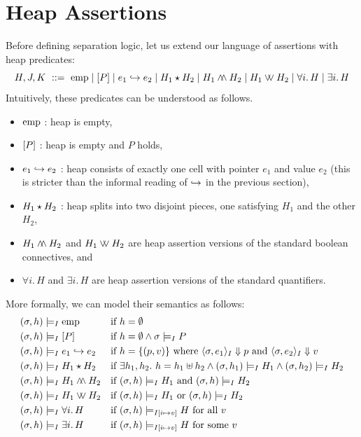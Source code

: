 \section{Heap Assertions}
%
Before defining separation logic, let us extend our language of assertions with heap predicates:
\[
  H,J,K\ ::=\ \emp\mid\pure{P}\mid e_1\pto e_2\mid H_1\sep H_2\mid H_1\hand H_2\mid H_1\hor H_2
  \mid\forall i.\,H\mid\exists i.\,H
\]
Intuitively, these predicates can be understood as follows.
\begin{itemize}
  \item $\mathrm{emp}$ : heap is empty,
  \item $[P]$ : heap is empty and $P$ holds,
  \item $e_1\hookrightarrow e_2$ : heap consists of exactly one cell with pointer $e_1$ and value $e_2$ (this
    is stricter than the informal reading of $\hookrightarrow$ in the previous section),
  \item $H_1\mathbin{\star} H_2$ : heap splits into two disjoint pieces, one satisfying $H_1$ and the other
    $H_2$,
  \item $H_1\mathbin{\wedge\!\!\wedge} H_2$ and $H_1\mathbin{\vee\!\!\vee} H_2$ are heap assertion versions of the standard boolean
    connectives, and
  \item $\forall i.\,H$ and $\exists i.\,H$ are heap assertion versions of the standard
    quantifiers.
\end{itemize}
More formally, we can model their semantics as follows:
\begin{align*}
  (\sigma,h)&\models_I\mathrm{emp} && \text{if } h=\emptyset\\
  (\sigma,h)&\models_I[P] && \text{if } h=\emptyset\wedge\sigma\models_I P\\
  (\sigma,h)&\models_I e_1\hookrightarrow e_2 && \text{if } h=\{(p,v)\}\text{ where }\langle \sigma,e_1\rangle_I\mathrel{\Downarrow} p\text{ and }\langle \sigma,e_2\rangle_I\mathrel{\Downarrow} v\\
  (\sigma,h)&\models_I H_1\mathbin{\star} H_2 && \text{if } \exists h_1,h_2.\ h=h_1\uplus h_2\wedge(\sigma,h_1)\models_I H_1\wedge(\sigma,h_2)\models_I H_2\\
  (\sigma,h)&\models_I H_1\mathbin{\wedge\!\!\wedge} H_2 && \text{if } (\sigma,h)\models_I H_1\text{ and }(\sigma,h)\models_I H_2\\
  (\sigma,h)&\models_I H_1\mathbin{\vee\!\!\vee} H_2 && \text{if } (\sigma,h)\models_I H_1\text{ or }(\sigma,h)\models_I H_2\\
  (\sigma,h)&\models_I \forall i.\,H && \text{if } (\sigma,h)\models_{I[i\mapsto v]}H\text{ for all }v\\
  (\sigma,h)&\models_I \exists i.\,H && \text{if } (\sigma,h)\models_{I[i\mapsto v]}H\text{ for some }v
\end{align*}
